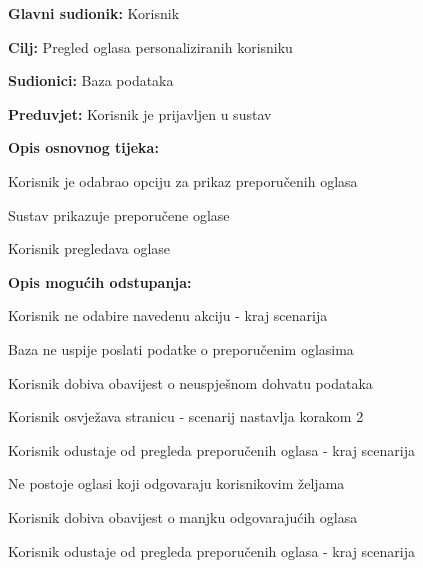 					\noindent {}
					\begin{packed_item}
	
						\item \textbf{Glavni sudionik: }Korisnik
						\item  \textbf{Cilj:} Pregled oglasa personaliziranih korisniku
						\item  \textbf{Sudionici:} Baza podataka
						\item  \textbf{Preduvjet:} Korisnik je prijavljen u sustav
						
						\eject
						
						\item  \textbf{Opis osnovnog tijeka:}
						
						\item[] \begin{packed_enum}
							\item Korisnik je odabrao opciju za prikaz preporučenih oglasa
							\item Sustav prikazuje preporučene oglase
							\item Korisnik pregledava oglase
						\end{packed_enum}

						\item  \textbf{Opis mogućih odstupanja:}

						\item[] \begin{packed_item}
							\item[1.a] Korisnik ne odabire navedenu akciju - kraj scenarija
							\item[2.a] Baza ne uspije poslati podatke o preporučenim oglasima
							\item[] \begin{packed_enum}		
								\item Korisnik dobiva obavijest o neuspješnom dohvatu podataka
								\item
									\begin{packed_enum}
										\item Korisnik osvježava stranicu - scenarij nastavlja korakom 2
										\item Korisnik odustaje od pregleda preporučenih oglasa - kraj scenarija
									\end{packed_enum}							
							\end{packed_enum}	
							\item[2.b] Ne postoje oglasi koji odgovaraju korisnikovim željama
							\item[] \begin{packed_enum}		
								\item Korisnik dobiva obavijest o manjku odgovarajućih oglasa
								\item Korisnik odustaje od pregleda preporučenih oglasa - kraj scenarija							
							\end{packed_enum}	
						\end{packed_item}	
					\end{packed_item}


